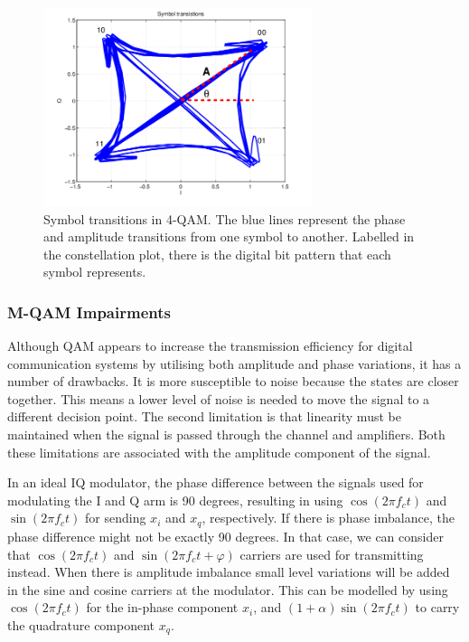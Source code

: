 \documentclass[12pt,a4paper,openright]{report}
\begin{document}
 \begin{figure}[H]
  \centering
    \includegraphics[width=0.7\textwidth]{4symboltransitions.png}
    \caption[Symbol transitions in 4-QAM]{Symbol transitions in 4-QAM. The blue lines represent the phase and amplitude transitions from one symbol to another. Labelled in the constellation plot, there is the digital bit pattern that each symbol represents.}
    \label{fig:4qamsym}
\end{figure}



\subsubsection{M-QAM Impairments}
Although QAM appears to increase the transmission efficiency for digital communication systems by utilising both amplitude and phase variations, it has a number of drawbacks. It is more susceptible to noise because the states are closer together. This means a lower level of noise is needed to move the signal to a different decision point. The second limitation is that linearity must be maintained when the signal is passed through the channel and amplifiers. Both these limitations are associated with the amplitude component of the signal. 

In an ideal IQ modulator, the phase difference between the signals used for modulating the I and Q arm is 90 degrees, resulting in using $\cos (2\pi {f_c}t)$ and $\sin (2\pi {f_c}t)$ for sending $x_i$ and $x_q$, respectively. If there is phase imbalance, the phase difference might not be exactly 90 degrees. In that case, we can consider that $\cos (2\pi {f_c}t)$ and $\sin (2\pi {f_c}t + \varphi )$ carriers are used for transmitting instead.
When there is amplitude imbalance small level variations will be added in the sine and cosine carriers at the modulator. This can be modelled by using $\cos (2\pi {f_c}t)$ for the in-phase component $x_i$, and  $(1 + \alpha )\sin (2\pi {f_c}t)$ to carry the quadrature component $x_q$.
\end{document}

